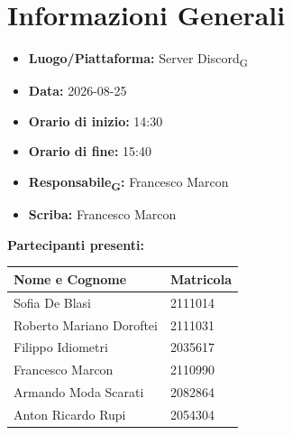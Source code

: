 
\section{Informazioni Generali}

\begin{itemize}

\item \textbf{Luogo/Piattaforma:} Server Discord\textsubscript{G}

\item \textbf{Data:} 2026-08-25

\item \textbf{Orario di inizio:} 14:30

\item \textbf{Orario di fine:} 15:40

\item \textbf{Responsabile\textsubscript{G}:} Francesco Marcon

\item \textbf{Scriba:} Francesco Marcon

\end{itemize}


\vspace{0.5cm}

\textbf{Partecipanti presenti:}

\begin{table}[ht]

\centering

\renewcommand{\arraystretch}{1.2}

\begin{tabularx}{\textwidth}{X l}

\toprule

\textbf{Nome e Cognome} & \textbf{Matricola} \\

\midrule

Sofia De Blasi & 2111014 \\

Roberto Mariano Doroftei & 2111031 \\

Filippo Idiometri & 2035617 \\

Francesco Marcon & 2110990 \\

Armando Moda Scarati & 2082864 \\

Anton Ricardo Rupi & 2054304 \\

\bottomrule

\end{tabularx}

\end{table}


